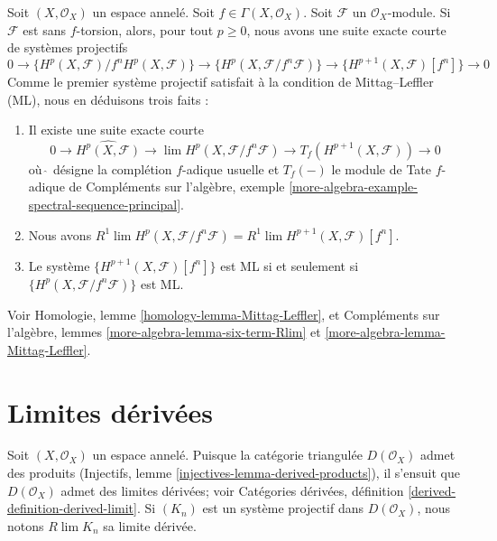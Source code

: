 \begin{remark}

\label{remark-compare-ML}

Soit $(X, \mathcal{O}_X)$ un espace annelé. Soit $f \in \Gamma(X, \mathcal{O}_X)$. Soit $\mathcal{F}$ un $\mathcal{O}_X$-module. Si $\mathcal{F}$ est sans $f$-torsion, alors, pour tout $p \geq 0$, nous avons une suite exacte courte de systèmes projectifs
$$
0 \to \{H^p(X, \mathcal{F})/f^nH^p(X, \mathcal{F})\}
\to \{H^p(X, \mathcal{F}/f^n\mathcal{F})\}
\to \{H^{p + 1}(X, \mathcal{F})[f^n]\} \to 0
$$
Comme le premier système projectif satisfait à la condition de Mittag--Leffler (ML), nous en déduisons trois faits :

\begin{enumerate}

\item Il existe une suite exacte courte
$$
0 \to \widehat{H^p(X, \mathcal{F})} \to
\lim H^p(X, \mathcal{F}/f^n\mathcal{F}) \to
T_f(H^{p + 1}(X, \mathcal{F})) \to 0
$$
où $\widehat{\ }$ désigne la complétion $f$-adique usuelle et
$T_f( - )$ le module de Tate $f$-adique de Compléments sur l'algèbre, exemple
\ref{more-algebra-example-spectral-sequence-principal}.
\item Nous avons
$R^1\lim H^p(X, \mathcal{F}/f^n\mathcal{F}) =
R^1\lim H^{p + 1}(X, \mathcal{F})[f^n]$.
\item Le système $\{H^{p + 1}(X, \mathcal{F})[f^n]\}$ est ML si et seulement si
$\{H^p(X, \mathcal{F}/f^n\mathcal{F})\}$ est ML.

\end{enumerate}

Voir Homologie, lemme \ref{homology-lemma-Mittag-Leffler}, et Compléments sur l'algèbre, lemmes \ref{more-algebra-lemma-six-term-Rlim} et
\ref{more-algebra-lemma-Mittag-Leffler}.

\end{remark}









\section{Limites dérivées}

\label{section-derived-limits}

\noindent
Soit $(X, \mathcal{O}_X)$ un espace annelé. Puisque la catégorie triangulée $D(\mathcal{O}_X)$ admet des produits (Injectifs, lemme \ref{injectives-lemma-derived-products}), il s'ensuit que $D(\mathcal{O}_X)$ admet des limites dérivées; voir Catégories dérivées, définition \ref{derived-definition-derived-limit}. Si $(K_n)$ est un système projectif dans $D(\mathcal{O}_X)$, nous notons $R\lim K_n$ sa limite dérivée.

